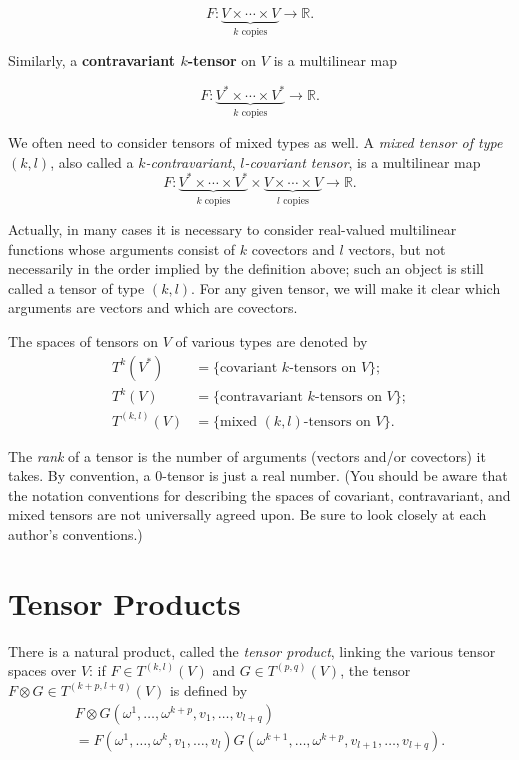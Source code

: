 \[
F: \underbrace{V \times \cdots \times V}_{k \text{ copies}} \to \mathbb{R}.
\]

Similarly, a \textbf{contravariant $k$-tensor} on $V$ is a multilinear map

\[
F : \underbrace{V^* \times \cdots \times V^*}_{k \text{ copies}} \to \mathbb{R}.
\]

We often need to consider tensors of mixed types as well. A \emph{mixed tensor of type} $(k, l)$, also called a $k$\emph{-contravariant}, $l$\emph{-covariant tensor}, is a multilinear map
\[
F : \underbrace{V^* \times \cdots \times V^*}_{k \text{ copies}} \times \underbrace{V \times \cdots \times V}_{l \text{ copies}} \to \mathbb{R}.
\]

Actually, in many cases it is necessary to consider real-valued multilinear functions whose arguments consist of $k$ covectors and $l$ vectors, but not necessarily in the order implied by the definition above; such an object is still called a tensor of type $(k,l)$. For any given tensor, we will make it clear which arguments are vectors and which are covectors.

The spaces of tensors on $V$ of various types are denoted by
\begin{align*}
T^k(V^*) &= \{\text{covariant } k\text{-tensors on } V\}; \\
T^k(V) &= \{\text{contravariant } k\text{-tensors on } V\}; \\
T^{(k,l)}(V) &= \{\text{mixed } (k,l)\text{-tensors on } V\}.
\end{align*}

The \emph{rank} of a tensor is the number of arguments (vectors and/or covectors) it takes. By convention, a $0$-tensor is just a real number. (You should be aware that the notation conventions for describing the spaces of covariant, contravariant, and mixed tensors are not universally agreed upon. Be sure to look closely at each author's conventions.)

\section{Tensor Products}

There is a natural product, called the \emph{tensor product}, linking the various tensor spaces over $V$: if $F \in T^{(k,l)}(V)$ and $G \in T^{(p,q)}(V)$, the tensor $F \otimes G \in T^{(k+p,l+q)}(V)$ is defined by
\[
\begin{split}
F \otimes G(\omega^1, \ldots, \omega^{k+p}, v_1, \ldots, v_{l+q}) \\
= F(\omega^1, \ldots, \omega^k, v_1, \ldots, v_l) G(\omega^{k+1}, \ldots, \omega^{k+p}, v_{l+1}, \ldots, v_{l+q}).
\end{split}
\]

